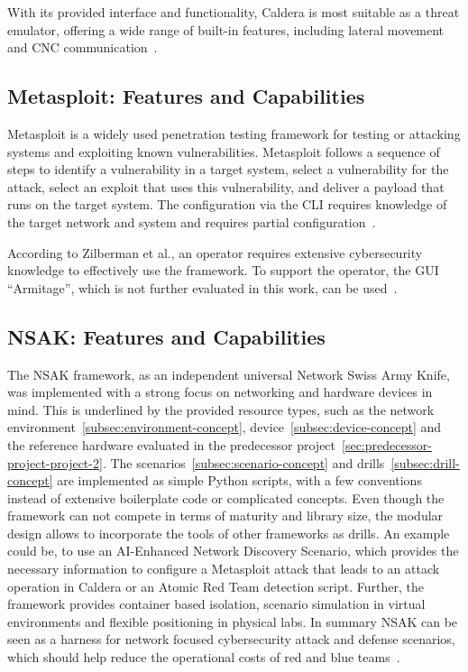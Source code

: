 With its provided interface and functionality, Caldera is most suitable as a threat emulator,
offering a wide range of built-in features, including lateral movement and \gls{CNC} communication~\cite{Zilberman2020SoKThreatEmulators}.

\subsection{Metasploit: Features and Capabilities}\label{subsec:metasploit-evalutaion}

Metasploit is a widely used penetration testing framework for testing or attacking systems and exploiting known vulnerabilities.
Metasploit follows a sequence of steps to identify a vulnerability in a target system, select a vulnerability for the attack,
select an exploit that uses this vulnerability, and deliver a payload that runs on the target system.
The configuration via the \gls{CLI} requires knowledge of the target network and system and requires partial configuration~\cite{metasploitbook, metasploitdocs}.

According to Zilberman et al., an operator requires extensive cybersecurity knowledge to effectively use the framework.
To support the operator, the \gls{GUI} \enquote{Armitage}, which is not further evaluated in this work, can be used~\cite{Zilberman2020SoKThreatEmulators}.


\subsection{NSAK: Features and Capabilities}\label{subsec:nsak-usp}
The \gls{NSAK} framework, as an independent universal Network Swiss Army Knife,
was implemented with a strong focus on networking and hardware devices in mind.
This is underlined by the provided resource types, such as the network environment~\ref{subsec:environment-concept},
device~\ref{subsec:device-concept} and the reference hardware evaluated in the predecessor project~\ref{sec:predecessor-project-project-2}.
The scenarios~\ref{subsec:scenario-concept} and drills~\ref{subsec:drill-concept} are implemented as simple Python scripts,
with a few conventions instead of extensive boilerplate code or complicated concepts.
Even though the framework can not compete in terms of maturity and library size,
the modular design allows to incorporate the tools of other frameworks as drills.
An example could be, to use an \gls{AI}-Enhanced Network Discovery Scenario,
which provides the necessary information to configure a Metasploit attack that leads to an attack operation in Caldera or an Atomic Red Team detection script.
Further, the framework provides container based isolation, scenario simulation in virtual environments and flexible positioning in physical labs.
In summary \gls{NSAK} can be seen as a harness for network focused cybersecurity attack and defense scenarios,
which should help reduce the operational costs of red and blue teams~\cite{nsakRepository2026}.


